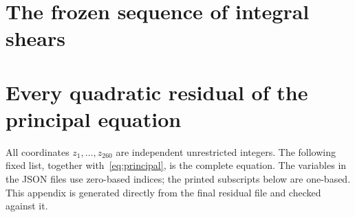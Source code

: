 \documentclass[10pt,letterpaper]{article}
\theoremstyle{definition}\newtheorem{definition}[theorem]{Definition}
\begin{document}
\clearpage\appendix
\section{The frozen sequence of integral shears}\label{app:shears}


\clearpage
\section{Every quadratic residual of the principal equation}\label{app:residuals}
All coordinates $z_1,\ldots,z_{260}$ are independent unrestricted integers.
The following fixed list, together with~\eqref{eq:principal}, is the complete
equation. The variables in the JSON files use zero-based indices; the
printed subscripts below are one-based. This appendix is generated directly
from the final residual file and checked against it.
\begingroup\small
\setlength{\abovedisplayskip}{5pt}\setlength{\belowdisplayskip}{5pt}
\setlength{\abovedisplayshortskip}{3pt}\setlength{\belowdisplayshortskip}{3pt}
\setlength{\jot}{2pt}

\endgroup
\end{document}
